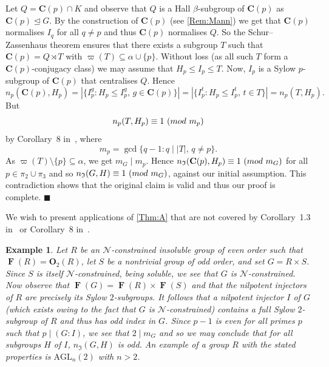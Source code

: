 \documentclass[10pt,a4paper]{amsart}
\numberwithin{equation}{section}
\DeclareMathOperator{\fitt}{\mathbf{F}}
\newcommand{\card}[1]{\left\lvert{#1}\right\rvert}
\renewcommand{\leq}{\leqslant}
\newcommand{\md}[1]{\,\left(\textnormal{mod}\ #1\right)}
\newenvironment{proofofA}{{\bf {Proof of Theorem \ref{Thm:A}.} }}{\hfill $\blacksquare$ \\}
\def\C_p{{\mathbf{C}(p)}}
\newtheorem{example}[theorem]{Example}
\begin{document}
\begin{proofofA}
Let  $Q = \C_p \cap K$ and observe that 
$Q$ is a Hall $\beta$-subgroup of $\C_p$ as $\C_p \unlhd G$. 
By the construction of $\C_p$ (see \autoref{Rem:Mann}) 
we get that  $\C_p$ normalises $I_q$ for all $q \neq p$ and thus $\C_p$ normalises $Q$.	
So the Schur--Zassenhaus theorem ensures 
that there exists a subgroup $T$ 
such that $\C_p = Q \rtimes T$ with $\varpi(T) \subseteq \alpha \cup \{p\}$. 
Without loss 
(as all such $T$ form a $\C_p$-conjugacy class) 
we may assume that $H_p \leq I_p \leq T$. 
Now,  $I_p$ is a Sylow $p$-subgroup of $\C_p$ that centralises $Q$. 
Hence 
\[
n_p(\C_p, H_p)   = \card{\{ I_p^g : H_p \leq I_p^g,\, g \in \C_p \}} 
                = \card{\{ I_p^t : H_p \leq I_p^t,\, t \in T \}}
                = n_p(T, H_p). 
\]
But 
\[
n_p(T, H_p) \equiv 1 \md{m_p}
\]
by Corollary~8 in~\cite{congruences},
where 
\[
m_p = \gcd\{q-1 : q \mid \card{T},\, q \neq p\}.
\]
As $\varpi(T) \setminus \{p\} \subseteq \alpha $, 
we get  $m_G \mid m_p$. 
Hence  $n_\mathfrak{I}(\C_p, H_p ) \equiv 1\md{m_G}$ 
for all $p \in \pi_2 \cup  \pi_3$ and so  $n_\mathfrak{I}(G, H) \equiv 1\md{m_G}$, 
against our initial assumption.
This contradiction shows that the original claim is valid and thus our proof is complete.	
\end{proofofA}

We wish to present applications of \autoref{Thm:A} 
that are not covered by Corollary~1.3 in~\cite{arithmetical_questions}
or Corollary~8 in~\cite{congruences}.

\begin{example}
Let $R$ be an $\mathcal{N}$-constrained insoluble group of even order such that $\fitt(R) = \mathbf{O}_2(R)$, 
let $S$ be a nontrivial group of odd order, and set $G = R \times S$.
Since $S$ is itself $\mathcal{N}$-constrained, being soluble,
we see that $G$ is $\mathcal{N}$-constrained.
Now observe that $\fitt(G) = \fitt(R) \times \fitt(S)$
and that the nilpotent injectors of $R$ are precisely its Sylow $2$-subgroups.
It follows that a nilpotent injector $I$ of $G$ 
(which exists owing to the fact that $G$ is $\mathcal{N}$-constrained)
contains a full Sylow $2$-subgroup of $R$ and thus has odd index in $G$.
Since $p-1$ is even for all primes $p$ such that $p \mid (G : I)$,
we see that $2 \mid m_G$ and so we may conclude that 
for all subgroups $H$ of $I$, $n_\mathfrak{I}(G, H)$ is odd.
An example of a group $R$ with the stated properties 
is $\mathrm{AGL}_n(2)$ with $n > 2$.
\end{example}
\end{document}
